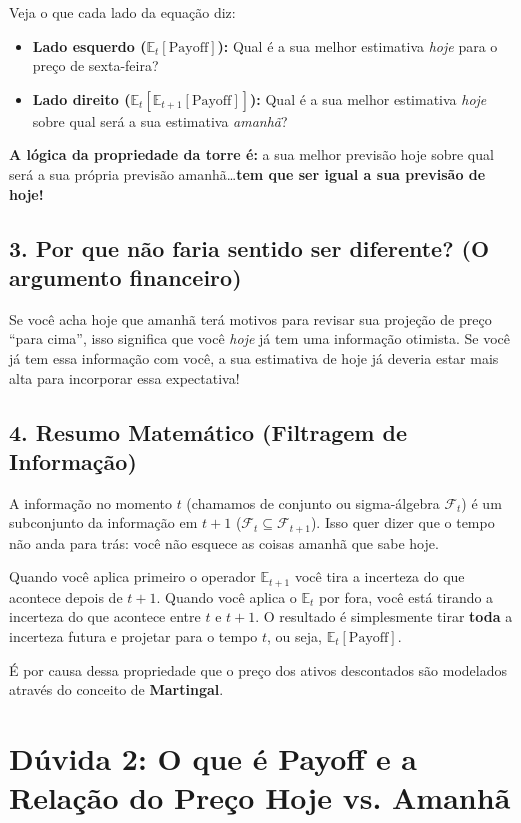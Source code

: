 \documentclass[12pt,a4paper]{article}
\begin{document}
Veja o que cada lado da equação diz:
\begin{itemize}
    \item \textbf{Lado esquerdo ($\mathbb{E}_t[\text{Payoff}]$):} Qual é a sua melhor estimativa \textit{hoje} para o preço de sexta-feira?
    \item \textbf{Lado direito ($\mathbb{E}_t[\mathbb{E}_{t+1}[\text{Payoff}]]$):} Qual é a sua melhor estimativa \textit{hoje} sobre qual será a sua estimativa \textit{amanhã}?
\end{itemize}

\textbf{A lógica da propriedade da torre é:} a sua melhor previsão hoje sobre qual será a sua própria previsão amanhã\dots \textbf{tem que ser igual a sua previsão de hoje!}

\subsection{3. Por que não faria sentido ser diferente? (O argumento financeiro)}
Se você acha hoje que amanhã terá motivos para revisar sua projeção de preço ``para cima'', isso significa que você \textit{hoje} já tem uma informação otimista. Se você já tem essa informação com você, a sua estimativa de hoje já deveria estar mais alta para incorporar essa expectativa!

\subsection{4. Resumo Matemático (Filtragem de Informação)}
A informação no momento $t$ (chamamos de conjunto ou sigma-álgebra $\mathcal{F}_t$) é um subconjunto da informação em $t+1$ ($\mathcal{F}_t \subseteq \mathcal{F}_{t+1}$). Isso quer dizer que o tempo não anda para trás: você não esquece as coisas amanhã que sabe hoje.

Quando você aplica primeiro o operador $\mathbb{E}_{t+1}$ você tira a incerteza do que acontece depois de $t+1$. Quando você aplica o $\mathbb{E}_t$ por fora, você está tirando a incerteza do que acontece entre $t$ e $t+1$. O resultado é simplesmente tirar \textbf{toda} a incerteza futura e projetar para o tempo $t$, ou seja, $\mathbb{E}_t[\text{Payoff}]$.

É por causa dessa propriedade que o preço dos ativos descontados são modelados através do conceito de \textbf{Martingal}.

\section{Dúvida 2: O que é Payoff e a Relação do Preço Hoje vs. Amanhã}
\end{document}
